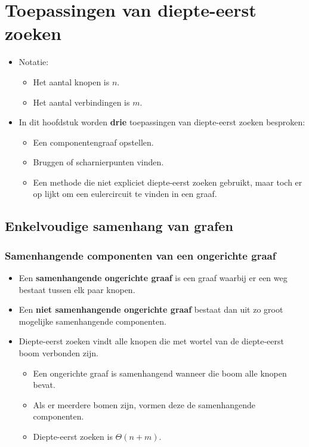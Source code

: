 \chapter{Toepassingen van diepte-eerst zoeken}
\begin{itemize}
	\item Notatie:
	\begin{itemize}
		\item Het aantal knopen is $n$.
		\item Het aantal verbindingen is $m$.
	\end{itemize}
	\item In dit hoofdstuk worden \textbf{drie} toepassingen van diepte-eerst zoeken besproken:
	\begin{itemize}
		\item Een componentengraaf opstellen.
		\item Bruggen of scharnierpunten vinden.
		\item Een methode die niet expliciet diepte-eerst zoeken gebruikt, maar toch er op lijkt om een eulercircuit te vinden in een graaf.
	\end{itemize}
\end{itemize}
\section{Enkelvoudige samenhang van grafen}
\subsection{Samenhangende componenten van een ongerichte graaf}
\begin{itemize}
	\item Een \textbf{samenhangende ongerichte graaf} is een graaf waarbij er een weg bestaat tussen elk paar knopen.
	\item Een \textbf{niet samenhangende ongerichte graaf} bestaat dan uit zo groot mogelijke samenhangende componenten.
	\item Diepte-eerst zoeken vindt alle knopen die met wortel van de diepte-eerst boom verbonden zijn.
	\begin{itemize}
		\item Een ongerichte graaf is samenhangend wanneer die boom alle knopen bevat.
		\item Als er meerdere bomen zijn, vormen deze de samenhangende componenten.
		\item Diepte-eerst zoeken is $\Theta(n + m)$.
	\end{itemize}
\end{itemize}

